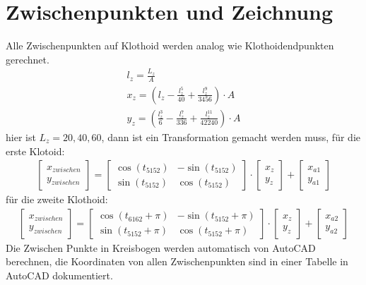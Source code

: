 \documentclass[12pt]{article}
\begin{document}
\section{Zwischenpunkten und Zeichnung}
Alle Zwischenpunkten auf Klothoid werden analog wie Klothoidendpunkten gerechnet.
\begin{gather*}
l_z = \frac{L_z}{A}\\
x_{z} = (l_z - \frac{l_z^5}{40} + \frac{l_z^9}{3456}) \cdot A\\
y_{z} = (\frac{l_z^3}{6} - \frac{l_z^7}{336} + \frac{l_z^{11}}{42240}) \cdot A
\end{gather*}
hier ist $L_z = 20,40,60$, dann ist ein Transformation gemacht werden muss, für die erste Klotoid:
\begin{gather*}
\begin{bmatrix}
x_{zwischen} \\
y_{zwischen}
\end{bmatrix} = \begin{bmatrix}
\cos (t_{5152}) & -\sin (t_{5152}) \\
\sin (t_{5152}) & \cos (t_{5152})
\end{bmatrix} \cdot \begin{bmatrix}
x_z \\
y_z
\end{bmatrix} + \begin{bmatrix}
x_{a1} \\
y_{a1}
\end{bmatrix}
\end{gather*}
für die zweite Klothoid: 
\begin{gather*}
\begin{bmatrix}
x_{zwischen} \\
y_{zwischen}
\end{bmatrix} = \begin{bmatrix}
\cos (t_{6162} + \pi) & -\sin (t_{5152} + \pi)\\
\sin (t_{5152} + \pi)& \cos (t_{5152} + \pi)
\end{bmatrix} \cdot \begin{bmatrix}
x_z \\
y_z
\end{bmatrix} + \begin{bmatrix}
x_{a2} \\
y_{a2}
\end{bmatrix}
\end{gather*}
Die Zwischen Punkte in Kreisbogen werden automatisch von AutoCAD berechnen, die Koordinaten von allen Zwischenpunkten sind in  einer Tabelle in AutoCAD dokumentiert. 
\end{document}
